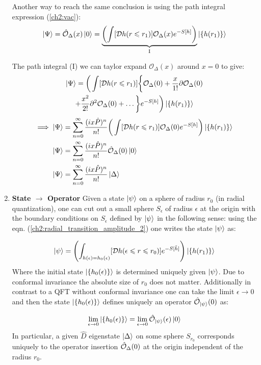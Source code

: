 \begin{enumerate}
  Another way to reach the same conclusion is using the path integral expression (\ref{ch2:vac}):
  \begin{align}
   \ket{\Psi}=\hat{\mathcal{O}}_{\Delta}(x) \ket{0} = \underbrace{\left(\int [\mathcal{D}h(r \leqslant r_1)] \mathcal{O}_\Delta (x) e^{-S[h]} \right)}_{\text{I}}\ket{\{h(r_1)\}}
   \end{align}
   
   The path integral (I) we can taylor expand $\mathcal{O}_\Delta (x)$ around $x=0$ to give:
  \begin{multline}
   \ket{\Psi} = \bigg( \int [\mathcal{D}h(r \leqslant r_1)] \bigg\lbrace \mathcal{O}_\Delta (0) + \frac{x}{1!}\partial \mathcal{O}_\Delta (0)  \\ 
   + \frac{x^2}{2!}\partial^2 \mathcal{O}_\Delta (0)+\dots \bigg\rbrace e^{-S[h]} \bigg)\ket{\{h(r_1)\}}
   \end{multline} 
   \begin{align}
    \implies \ket{\Psi} &= \sum_{n=0}^{\infty} \frac{(ix\hat P)^n}{n!}\bigg( \int [\mathcal{D}h(r \leqslant r_1)]  \mathcal{O}_\Delta (0) e^{-S[h]} \bigg)\ket{\{h(r_1)\}} \\
    \ket{\Psi} &= \sum_{n=0}^{\infty} \frac{(ix\hat P)^n}{n!} \hat{\mathcal{O}}_\Delta(0)\ket{0} \\
    \ket{\Psi} &= \sum_{n=0}^{\infty} \frac{(ix\hat P)^n}{n!} \ket{\Delta}
   \end{align}
  \item \textbf{State $\rightarrow$ Operator} Given a state $\ket{\psi}$ on a sphere of radius $r_0$ (in radial quantization), one can cut out a small sphere $S_\epsilon$ of radius $\epsilon$ at the origin with the boundary conditions on $S_\epsilon$ defined by $\ket{\psi}$ in the following sense: using the eqn. (\ref{ch2:radial_transition_amplitude_2}) one writes the state $\ket{\psi}$ as:
  
  \begin{align}
   \ket{\psi} = \left( \int_{h(\epsilon)=h_0(\epsilon)} [\mathcal{D}h(\epsilon \leqslant r \leqslant r_0)]   e^{-S[\tilde{h}]} \right) \ket{\{h(r_1)\}}
  \end{align}
  Where the initial state $\ket{\{h_0(\epsilon)\}}$ is determined uniquely given $\ket{\psi}$. Due to conformal invariance the absolute size of $r_0$ does not matter. Additionally in contrast to a QFT without conformal invariance one can take the limit $\epsilon \to 0$ and then the state $\ket{\{h_0(\epsilon)\}}$ defines uniquely an operator $\hat{\mathcal{O}}_{\ket{\psi}}(0)$ as:
  
  \begin{align}
   \lim_{\epsilon \to 0} \ket{\{h_0(\epsilon)\}} = \lim_{\epsilon \to 0}\hat{\mathcal{O}}_{\ket{\psi}}(\epsilon) \ket{0}
  \end{align}
  In particular, a given $\hat{D}$ eigenstate $\ket{\Delta}$ on some sphere $S_{r_0}$ corresponds uniquely to the operator insertion $\hat{\mathcal{{O}}}_\Delta(0)$ at the origin independent of the radius $r_0$.
   \end{enumerate}
  
